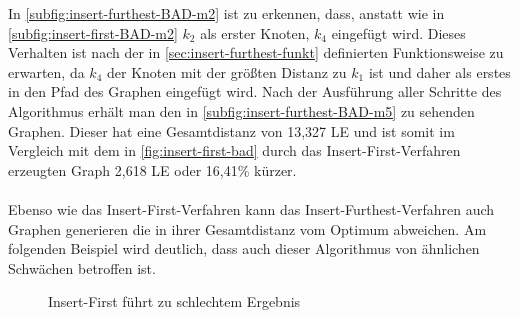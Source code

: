 In \vref{subfig:insert-furthest-BAD-m2} ist zu erkennen, dass, anstatt wie in \vref{subfig:insert-first-BAD-m2} $k_2$ als erster Knoten, $k_4$ eingefügt wird.
Dieses Verhalten ist nach der in \vref{sec:insert-furthest-funkt} definierten Funktionsweise zu erwarten, da $k_4$ der Knoten mit der größten Distanz zu $k_1$ ist und daher als erstes in den Pfad des Graphen eingefügt wird.
Nach der Ausführung aller Schritte des Algorithmus erhält man den in \vref{subfig:insert-furthest-BAD-m5} zu sehenden Graphen.
Dieser hat eine Gesamtdistanz von 13,327 \ac{LE} und ist somit im Vergleich mit dem in \vref{fig:insert-first-bad} durch das Insert-First-Verfahren erzeugten Graph 2,618 \ac{LE} oder 16,41\% kürzer.
\\\\
Ebenso wie das Insert-First-Verfahren kann das Insert-Furthest-Verfahren auch Graphen generieren die in ihrer Gesamtdistanz vom Optimum abweichen. Am folgenden Beispiel wird deutlich, dass auch dieser Algorithmus von ähnlichen Schwächen betroffen ist.
\begin{figure}[H]
    \begin{center}
        \hfil
        \caption{Insert-First führt zu schlechtem Ergebnis}
        \label{fig:insert-furthest-bad}
    \end{center}
\end{figure}
